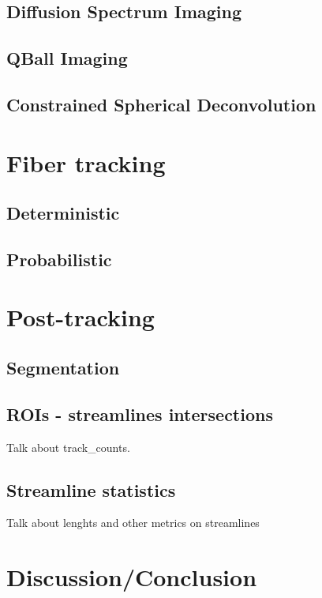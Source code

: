 \documentclass{bioinfo}
\begin{document}
\citep{westin:97}

\subsection{Diffusion Spectrum Imaging}

\subsection{QBall Imaging}

\subsection{Constrained Spherical Deconvolution} 

\section{Fiber tracking}

\subsection{Deterministic}

\subsection{Probabilistic}

\section{Post-tracking}

\subsection{Segmentation}

\subsection{ROIs - streamlines intersections}

Talk about track\_counts.

\subsection{Streamline statistics}

Talk about lenghts and other metrics on streamlines

\section{Discussion/Conclusion}
\end{document}
